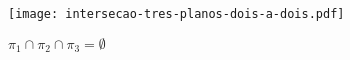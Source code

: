 \begin{figure}[h]
    \caption{$\pi_1\cap\pi_2\cap\pi_3 = \emptyset$}
    \centering
    \texttt{[image: intersecao-tres-planos-dois-a-dois.pdf]}
\end{figure}

